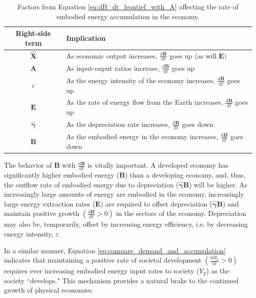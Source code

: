 \documentclass[authoryear,preprint,review,12pt]{elsarticle}
\let\oldhat\hat
\renewcommand{\vec}[1]{\mathbf{#1}}
\renewcommand{\hat}[1]{\oldhat{\mathbf{#1}}}
\begin{document}
\begin{table}
\caption{Factors from Equation \ref{eq:dB_dt_leontief_with_A} affecting the rate of embodied energy accumulation in the economy.}
\begin{center}
  \begin{tabular}{| c | l | }
    \hline
    Right-side term & Implication \\ \hline
    $\hat{\vec{X}}$ & As economic output increases, $\frac{\mathrm{d}\vec{B}}{\mathrm{d}t}$ goes up (as will $\vec{E})$  \\ \hline
    $\vec{A}$ & As input-ouput ratios increase, $\frac{\mathrm{d}\vec{B}}{\mathrm{d}t}$ goes up  \\ \hline
    $\varepsilon$ & As the energy intensity of the economy increases, $\frac{\mathrm{d}\vec{B}}{\mathrm{d}t}$ goes up  \\ \hline
   $ \vec{E}$ & As the rate of energy flow from the Earth increases, $\frac{\mathrm{d}\vec{B}}{\mathrm{d}t}$ goes up  \\ \hline
    $\hat{\vec{\gamma}}$ & As the depreciation rate increases, $\frac{\mathrm{d}\vec{B}}{\mathrm{d}t}$ goes down  \\ \hline
    $\vec{B}$ & As the embodied energy in the economy increases, $\frac{\mathrm{d}\vec{B}}{\mathrm{d}t}$ goes down  \\ \hline
  \end{tabular}
\end{center}
\label{table:embodied_energy_accumulation_factors}
\end{table}


The behavior of $\vec{B}$ with $\frac{\mathrm{d}\vec{B}}{\mathrm{d}t}$ is vitally important. A developed economy has significantly higher embodied energy ($\vec{B}$) than a developing economy, and, thus, the outflow rate of embodied energy due to depreciation ($\hat{\vec{\gamma}}\vec{B}$) will be higher. As increasingly large amounts of energy are embodied in the economy, increasingly large energy extraction rates ($\vec{E}$) are required to offset depreciation ($\hat{\vec{\gamma}}\vec{B}$) and maintain positive growth $\left(\frac{\mathrm{d}\vec{B}}{\mathrm{d}t} > 0\right)$ in the sectors of the economy. Depreciation may also be, temporarily, offset by increasing energy efficiency, i.e. by decreasing energy intensity, $\varepsilon$.

In a similar manner, Equation \ref{eq:compare_demand_and_accumulation} indicates that maintaining a positive rate of societal development $\left(\frac{\mathrm{d}B_{2}}{\mathrm{d}t} > 0\right)$ requires ever increasing embodied energy input rates to society ($Y_{\dot{T}}$) as the society ``develops." This mechanism provides a natural brake to the continued growth of physical economies.
\end{document}
